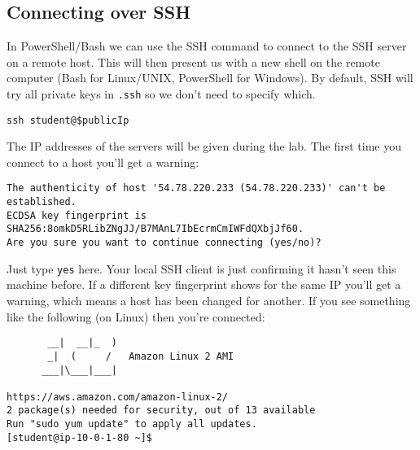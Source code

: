 \subsection{Connecting over SSH}
\label{connecting-over-ssh}

In PowerShell/Bash we can use the SSH command to connect to the SSH server on a remote host.
This will then present us with a new shell on the remote computer (Bash for Linux/UNIX, PowerShell for Windows).
By default, SSH will try all private keys in \texttt{.ssh} so we don't need to specify which.

\begin{verbatim}
ssh student@$publicIp 
\end{verbatim}

The IP addresses of the servers will be given during the lab.
The first time you connect to a host you'll get a warning:

\begin{verbatim}
The authenticity of host '54.78.220.233 (54.78.220.233)' can't be established.
ECDSA key fingerprint is SHA256:8omkD5RLibZNgJJ/B7MAnL7IbEcrmCmIWFdQXbjJf60.
Are you sure you want to continue connecting (yes/no)?
\end{verbatim}

Just type \texttt{yes} here.
Your local SSH client is just confirming it hasn't seen this machine before.
If a different key fingerprint shows for the same IP you'll get a warning, which means a host has been changed for another.
If you see something like the following (on Linux) then you're connected:

\begin{verbatim}
       __|  __|_  )
       _|  (     /   Amazon Linux 2 AMI
      ___|\___|___|

https://aws.amazon.com/amazon-linux-2/
2 package(s) needed for security, out of 13 available
Run "sudo yum update" to apply all updates.
[student@ip-10-0-1-80 ~]$
\end{verbatim}


